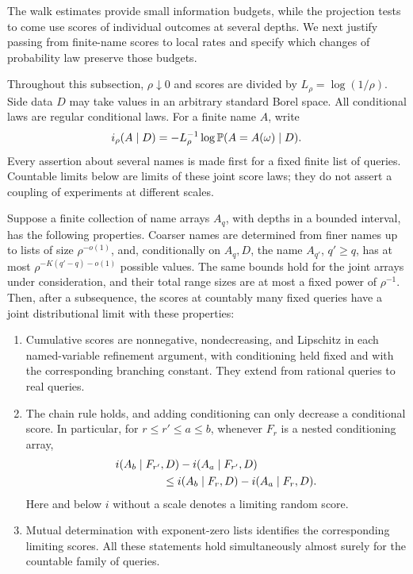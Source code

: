 The walk estimates provide small information budgets, while the projection
tests to come use scores of individual outcomes at several depths. We next
justify passing from finite-name scores to local rates and specify which
changes of probability law preserve those budgets.

Throughout this subsection, $\rho\downarrow0$ and scores are divided by
$L_\rho=\log(1/\rho)$.  Side data $D$ may take values in an arbitrary
standard Borel space.  All conditional laws are regular conditional laws.
For a finite name $A$, write
\[
 i_\rho(A\mid D)
   =-L_\rho^{-1}\log\mathbb P(A=A(\omega)\mid D).
\]
Every assertion about several names is made first for a fixed finite list
of queries.  Countable limits below are limits of these joint score laws;
they do not assert a coupling of experiments at different scales.

\begin{lemma}
\label{names:score-limits}
Suppose a finite collection of name arrays $A_q$, with depths in a bounded
interval, has the following properties.  Coarser names are determined
from finer names up to lists of size $\rho^{-o(1)}$, and, conditionally on
$A_q,D$, the name $A_{q'}$, $q'\ge q$, has at most
$\rho^{-K(q'-q)-o(1)}$ possible values.  The same bounds hold for the
joint arrays under consideration, and their total range sizes are at
most a fixed power of $\rho^{-1}$.  Then, after a subsequence, the scores
at countably many fixed queries have a joint distributional limit with
these properties:
\begin{enumerate}[label=\textup{(\roman*)}]
\item Cumulative scores are nonnegative, nondecreasing, and Lipschitz in
each named-variable refinement argument, with conditioning held fixed
and with the corresponding branching constant.
They extend from rational queries to real queries.
\item The chain rule holds, and adding conditioning can only decrease a
conditional score.  In particular, for $r\le r'\le a\le b$, whenever
$F_r$ is a nested conditioning array,
\begin{align}
 &i(A_b\mid F_{r'},D)-i(A_a\mid F_{r'},D)\notag\\
 &\hspace{15mm}\le
 i(A_b\mid F_r,D)-i(A_a\mid F_r,D).
 \label{names:score-increment-monotonicity}
\end{align}
Here and below $i$ without a scale denotes a limiting random score.
\item Mutual determination with exponent-zero lists identifies the
corresponding limiting scores.  All these statements hold simultaneously
almost surely for the countable family of queries.
\end{enumerate}
\end{lemma}

